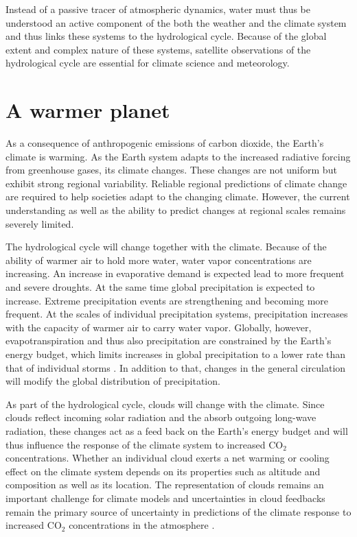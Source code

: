 Instead of a passive tracer of atmospheric dynamics, water must thus be
understood an active component of the both the weather and the climate system
and thus links these systems to the hydrological cycle. Because of the global
extent and complex nature of these systems, satellite observations of the
hydrological cycle are essential for climate science and meteorology.

\section{A warmer planet}

As a consequence of anthropogenic emissions of carbon dioxide, the Earth's
 climate is warming. As the Earth system adapts to the increased radiative
 forcing from greenhouse gases, its climate changes. These changes are not
 uniform but exhibit strong regional variability. Reliable regional predictions
 of climate change are required to help societies adapt to the changing climate.
 However, the current understanding as well as the ability to predict changes at
 regional scales remains severely limited.

The hydrological cycle will change together with the climate. Because of the
ability of warmer air to hold more water, water vapor concentrations are
increasing. An increase in evaporative demand is expected lead to more frequent
and severe droughts. At the same time global precipitation is expected to
increase. Extreme precipitation events are strengthening and becoming more
frequent. At the scales of individual precipitation systems, precipitation
increases with the capacity of warmer air to carry water vapor. Globally,
however, evapotranspiration and thus also precipitation are constrained by the
Earth's energy budget, which limits increases in global precipitation to a lower
rate than that of individual storms \citep{collins13}. In addition to that,
changes in the general circulation will modify the global distribution of
precipitation.

As part of the hydrological cycle, clouds will change with the climate. Since
clouds reflect incoming solar radiation and the absorb outgoing long-wave
radiation, these changes act as a feed back on the Earth's energy budget and
will thus influence the response of the climate system to increased CO$_2$
concentrations. Whether an individual cloud exerts a net warming or cooling
effect on the climate system depends on its properties such as altitude and
composition as well as its location. The representation of clouds remains an
important challenge for climate models and uncertainties in cloud feedbacks
remain the primary source of uncertainty in predictions of the climate response
to increased CO$_2$ concentrations in the atmosphere \citep{zelinka20}.

